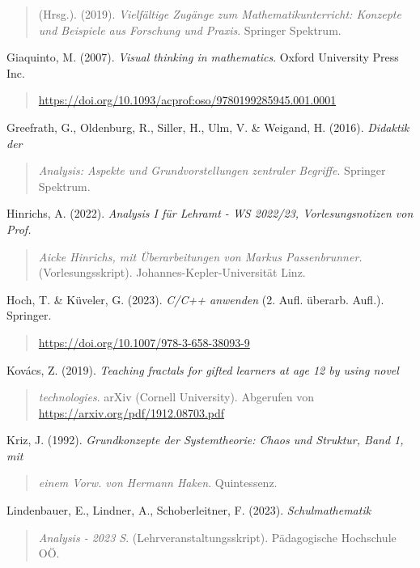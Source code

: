 \documentclass[a4paper, 12pt]{book}
\begin{document}
\begin{quote}
(Hrsg.). (2019). \emph{Vielfältige Zugänge zum Mathematikunterricht:
Konzepte und Beispiele aus Forschung und Praxis}. Springer Spektrum.
\end{quote}

Giaquinto, M. (2007). \emph{Visual thinking in mathematics}. Oxford
University Press Inc.

\begin{quote}
\url{https://doi.org/10.1093/acprof:oso/9780199285945.001.0001}
\end{quote}

Greefrath, G., Oldenburg, R., Siller, H., Ulm, V. \& Weigand, H. (2016).
\emph{Didaktik der}

\begin{quote}
\emph{Analysis: Aspekte und Grundvorstellungen zentraler Begriffe}.
Springer Spektrum.
\end{quote}

Hinrichs, A. (2022). \emph{Analysis I für Lehramt - WS 2022/23,
Vorlesungsnotizen von Prof.}

\begin{quote}
\emph{Aicke Hinrichs, mit Überarbeitungen von Markus Passenbrunner.}
(Vorlesungsskript). Johannes-Kepler-Universität Linz.
\end{quote}

Hoch, T. \& Küveler, G. (2023). \emph{C/C++ anwenden} (2. Aufl. überarb.
Aufl.). Springer.

\begin{quote}
\url{https://doi.org/10.1007/978-3-658-38093-9}
\end{quote}

Kovács, Z. (2019). \emph{Teaching fractals for gifted learners at age 12
by using novel}

\begin{quote}
\emph{technologies}. arXiv (Cornell University). Abgerufen von
\url{https://arxiv.org/pdf/1912.08703.pdf}
\end{quote}

Kriz, J. (1992). \emph{Grundkonzepte der Systemtheorie: Chaos und
Struktur, Band 1, mit}

\begin{quote}
\emph{einem Vorw. von Hermann Haken}. Quintessenz.
\end{quote}

Lindenbauer, E., Lindner, A., Schoberleitner, F. (2023).
\emph{Schulmathematik}

\begin{quote}
\emph{Analysis - 2023 S}. (Lehrveranstaltungsskript). Pädagogische
Hochschule OÖ.
\end{quote}
\end{document}
